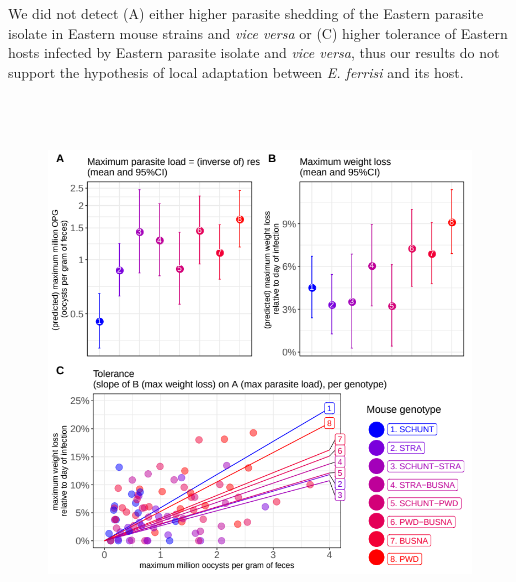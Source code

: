 \documentclass[12pt]{article}
\renewcommand{\_}{\kern-1.5pt\textunderscore\kern-1.5pt}
\begin{document}
{\fontsize{10pt}{12.0pt}\selectfont \textcolor[HTML]{FF0000}{We did not detect (A) either higher parasite shedding of the Eastern parasite isolate in Eastern mouse strains and \textit{vice versa} or (C) higher tolerance of Eastern hosts infected by Eastern parasite isolate and \textit{vice versa}, thus our results do not support the hypothesis of local adaptation between \textit{E. ferrisi} and its host. }\par}


\newpage
\par




\begin{figure}[H]
	\begin{Center}
		\includegraphics[width=5.53in,height=5.53in]{./media/image6.png}
	\end{Center}
\end{figure}



\par
\end{document}

